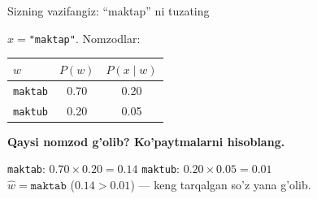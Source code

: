 \documentclass[aspectratio=169,11pt]{beamer}
\begin{document}
\begin{frame}{Sizning vazifangiz: ``maktap'' ni tuzating}
  \begin{tcolorbox}[warnbox,title=Savol --- 2 daqiqa]
    \small
    $x = $\texttt{"maktap"}. Nomzodlar:
    \begin{center}\footnotesize
    \begin{tabular}{lcc}
      \toprule
      $w$ & $P(w)$ & $P(x{\mid}w)$ \\
      \midrule
      \texttt{maktab} & 0.70 & 0.20 \\
      \texttt{maktub} & 0.20 & 0.05 \\
      \bottomrule
    \end{tabular}
    \end{center}
    \textbf{Qaysi nomzod g'olib? Ko'paytmalarni hisoblang.}
  \end{tcolorbox}
  \pause
  \begin{tcolorbox}[okbox,title=Javob]
    \small
    \texttt{maktab}: $0.70 \times 0.20 = \mathbf{0.14}$\qquad
    \texttt{maktub}: $0.20 \times 0.05 = 0.01$\\[3pt]
    $\hat{w} = \texttt{maktab}$ ($0.14 > 0.01$) --- keng tarqalgan so'z
    yana g'olib.
  \end{tcolorbox}
\end{frame}
\end{document}
